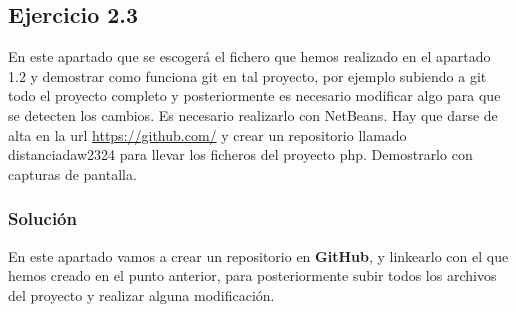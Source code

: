 \subsection{Ejercicio 2.3}
En este apartado que se escogerá el fichero que hemos realizado en el apartado 1.2 y demostrar como funciona git en tal proyecto, por ejemplo subiendo a git todo el proyecto completo y posteriormente es necesario modificar algo para que se detecten los cambios. Es necesario realizarlo con NetBeans. Hay que darse de alta en la url \url{https://github.com/} y crear un repositorio llamado distanciadaw2324 para llevar los ficheros del proyecto php. Demostrarlo con capturas de pantalla.

\subsubsection{Solución}
En este apartado vamos a crear un repositorio en \textbf{GitHub}, y linkearlo con el que hemos creado en el punto anterior, para posteriormente subir todos los archivos del proyecto y realizar alguna modificación.

